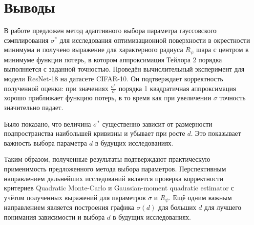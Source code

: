\documentclass[11pt,a4paper]{article}
\begin{document}
\section{Выводы}

В работе предложен метод адаптивного выбора параметра гауссовского сэмплирования $\sigma^*$ для исследования оптимизационной поверхности в окрестности минимума и получено выражение для характерного радиуса $R_\psi$ шара с центром в минимуме функции потерь, в котором аппроксимация Тейлора 2 порядка выполняется с заданной точностью. \newline
Проведён вычислительный эксперимент для модели ResNet-18 на датасете CIFAR-10. Он подтверждает корректность полученной оценки: при значениях $\frac{\sigma^*}{\sigma}$ порядка 1 квадратичная аппроксимация хорошо приближает функцию потерь, в то время как при увеличении $\sigma$ точность значительно падает.

Было показано, что величина $\sigma^*$ существенно зависит от размерности подпространства наибольшей кривизны и убывает при росте $d$. Это показывает важность выбора параметра $d$ в будущих исследованиях.

Таким образом, полученные результаты подтверждают практическую применимость предложенного метода выбора параметров. Перспективным направлением дальнейших исследований является проверка корректности критериев Quadratic Monte-Carlo и Gaussian-moment quadratic estimator с учётом полученных выражений для параметров $\sigma$ и $R_\psi$. Ещё одним важным направлением является построения графика $\sigma(d)$ для больших $d$ для лучшего понимания зависимости и выбора $d$ в будущих исследованиях.



\end{document}
